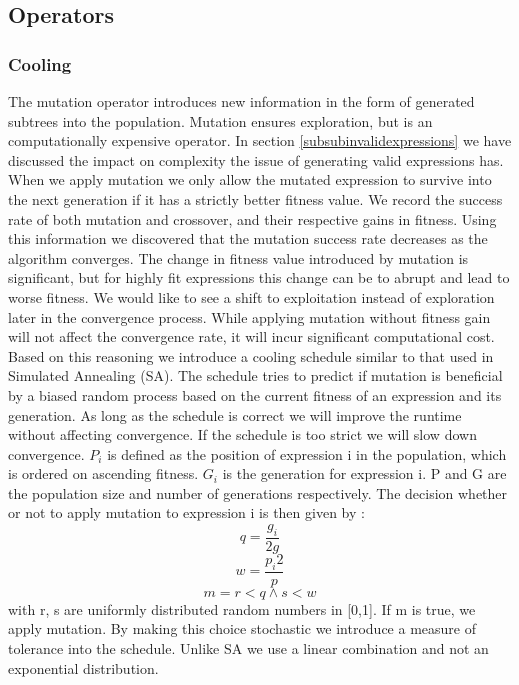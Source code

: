 \subsection{Operators}
\subsubsection{Cooling}
The mutation operator introduces new information in the form of generated subtrees into the population. Mutation ensures exploration, but is an computationally expensive operator. In section \ref{subsubinvalidexpressions} we have discussed the impact on complexity the issue of generating valid expressions has. When we apply mutation we only allow the mutated expression to survive into the next generation if it has a strictly better fitness value. We record the success rate of both mutation and crossover, and their respective gains in fitness. Using this information we discovered that the mutation success rate decreases as the algorithm converges. The change in fitness value introduced by mutation is significant, but for highly fit expressions this change can be to abrupt and lead to worse fitness. We would like to see a shift to exploitation instead of exploration later in the convergence process. While applying mutation without fitness gain will not affect the convergence rate, it will incur significant computational cost. Based on this reasoning we introduce a cooling schedule similar to that used in Simulated Annealing (SA). The schedule tries to predict if mutation is beneficial by a biased random process  based on the current fitness of an expression and its generation. As long as the schedule is correct we will improve the runtime without affecting convergence. If the schedule is too strict we will slow down convergence.
$P_i$ is defined as the position of expression i in the population, which is ordered on ascending fitness. $G_i$ is the generation for expression i. P and G are the population size and number of generations respectively. The decision whether or not to apply mutation to expression i is then given by :
\[
q = \frac{g_i}{2g}
\]
\[
w = \frac{p_i2}{p}
\]
\[
m = r < q \land s < w
\]
with r, s are uniformly distributed random numbers in [0,1].
If m is true, we apply mutation. By making this choice stochastic we introduce a measure of tolerance into the schedule. Unlike SA we use a linear combination and not an exponential distribution.
